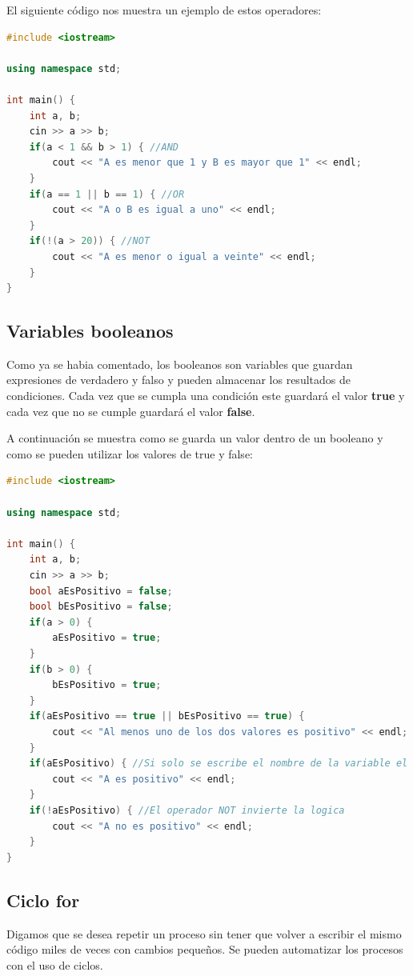 \documentclass{article}
\begin{document}
El siguiente código nos muestra un ejemplo de estos operadores:

\begin{lstlisting}[language=C++, title=Lógica booleana]
#include <iostream>

using namespace std;

int main() {
	int a, b;
	cin >> a >> b;
	if(a < 1 && b > 1) { //AND
		cout << "A es menor que 1 y B es mayor que 1" << endl;
	}
	if(a == 1 || b == 1) { //OR
		cout << "A o B es igual a uno" << endl;
	}
	if(!(a > 20)) { //NOT
		cout << "A es menor o igual a veinte" << endl;
	}
}
\end{lstlisting}

\subsection{Variables booleanos}

Como ya se habia comentado, los booleanos son variables que guardan expresiones de verdadero y falso y pueden almacenar los resultados de condiciones. Cada vez que se cumpla una condición este guardará el valor \textbf{true} y cada vez que no se cumple guardará el valor \textbf{false}.

A continuación se muestra como se guarda un valor dentro de un booleano y como se pueden utilizar los valores de true y false:

\begin{lstlisting}[language=C++, title=Booleanos]
#include <iostream>

using namespace std;

int main() {
	int a, b;
	cin >> a >> b;
	bool aEsPositivo = false;
	bool bEsPositivo = false;
	if(a > 0) {
		aEsPositivo = true;
	}
	if(b > 0) {
		bEsPositivo = true;
	}
	if(aEsPositivo == true || bEsPositivo == true) {
		cout << "Al menos uno de los dos valores es positivo" << endl;
	}
	if(aEsPositivo) { //Si solo se escribe el nombre de la variable el programa automaticamente checa si es verdadero
		cout << "A es positivo" << endl;
	}
	if(!aEsPositivo) { //El operador NOT invierte la logica
		cout << "A no es positivo" << endl;
	}
}
\end{lstlisting}

\subsection{Ciclo for}

Digamos que se desea repetir un proceso sin tener que volver a escribir el mismo código miles de veces con cambios pequeños. Se pueden automatizar los procesos con el uso de ciclos.
\end{document}
